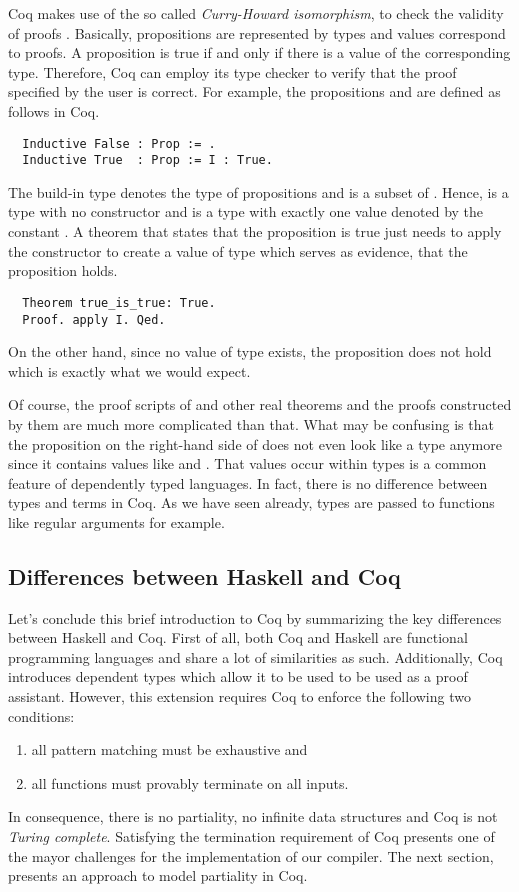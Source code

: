 Coq makes use of the so called \textit{Curry-Howard isomorphism}, to check the validity of proofs \cite[p.~1]{CoqDevTeam:2018}.
Basically, propositions are represented by types and values correspond to proofs.
A proposition is true if and only if there is a value of the corresponding type.
Therefore, Coq can employ its type checker to verify that the proof specified by the user is correct.
For example, the propositions  and  are defined as follows in Coq.
\begin{verbatim}
  Inductive False : Prop := .
  Inductive True  : Prop := I : True.
\end{verbatim}
The build-in type  denotes the type of propositions and is a subset of .
Hence,  is a type with no constructor and  is a type with exactly one value denoted by the constant .
A theorem that states that the proposition  is true just needs to apply the constructor  to create a value of type  which serves as evidence, that the proposition holds.
\begin{verbatim}
  Theorem true_is_true: True.
  Proof. apply I. Qed.
\end{verbatim}
On the other hand, since no value of type  exists, the proposition  does not hold which is exactly what we would expect.

Of course, the proof scripts of  and other real theorems and the proofs constructed by them are much more complicated than that.
What may be confusing is that the proposition on the right-hand side of  does not even look like a type anymore since it contains values like  and .
That values occur within types is a common feature of dependently typed languages.
In fact, there is no difference between types and terms in Coq.
As we have seen already, types are passed to functions like regular arguments for example.

\subsection{Differences between Haskell and Coq} \label{sec:preliminaries:coq:summary}
Let's conclude this brief introduction to Coq by summarizing the key differences between Haskell and Coq.
First of all, both Coq and Haskell are functional programming languages and share a lot of similarities as such.
Additionally, Coq introduces dependent types which allow it to be used to be used as a proof assistant.
However, this extension requires Coq to enforce the following two conditions:
\begin{enumerate}
  \item all pattern matching must be exhaustive and
  \item all functions must provably terminate on all inputs.
\end{enumerate}
In consequence, there is no partiality, no infinite data structures and Coq is not \textit{Turing complete}.
Satisfying the termination requirement of Coq presents one of the mayor challenges for the implementation of our compiler.
The next section, presents an approach to model partiality in Coq.
